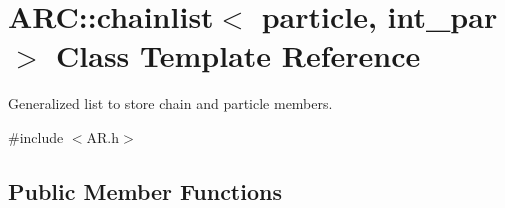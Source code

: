 \hypertarget{classARC_1_1chainlist}{}\section{A\+RC\+:\+:chainlist$<$ particle, int\+\_\+par $>$ Class Template Reference}
\label{classARC_1_1chainlist}


Generalized list to store chain and particle members.  




{\ttfamily \#include $<$A\+R.\+h$>$}

\subsection*{Public Member Functions}
